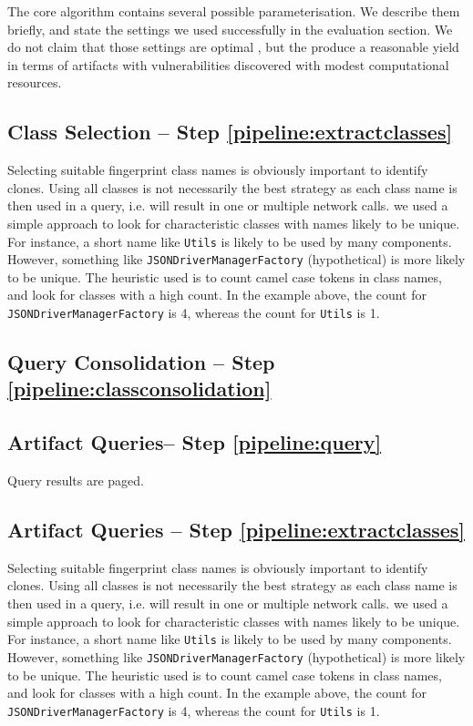 The core algorithm contains several possible parameterisation. We describe them briefly, and state the settings we used successfully in the evaluation section. We do not claim that those settings are optimal , but the produce a reasonable yield in terms of artifacts with vulnerabilities discovered with modest computational resources.




\subsection {Class Selection -- Step \ref{pipeline:extractclasses}}

Selecting suitable fingerprint class names is obviously important to identify clones. Using all classes is not necessarily the best strategy as each class name is then used in a query, i.e. will result in one or multiple network calls. we used a simple approach to look for characteristic classes with names likely to be unique. For instance, a short name like \texttt{Utils} is likely to be used by many components. However, something like \texttt{JSONDriverManagerFactory} (hypothetical) is more likely to be unique. The heuristic used is to count camel case tokens in class names, and look for classes with a high count. In the example above, the count for \texttt{JSONDriverManagerFactory} is 4, whereas the count for \texttt{Utils} is 1.



\subsection{Query Consolidation -- Step \ref{pipeline:classconsolidation}}

\subsection{Artifact Queries-- Step \ref{pipeline:query}}

Query results are paged. 


\subsection {Artifact Queries -- Step \ref{pipeline:extractclasses}}

Selecting suitable fingerprint class names is obviously important to identify clones. Using all classes is not necessarily the best strategy as each class name is then used in a query, i.e. will result in one or multiple network calls. we used a simple approach to look for characteristic classes with names likely to be unique. For instance, a short name like \texttt{Utils} is likely to be used by many components. However, something like \texttt{JSONDriverManagerFactory} (hypothetical) is more likely to be unique. The heuristic used is to count camel case tokens in class names, and look for classes with a high count. In the example above, the count for \texttt{JSONDriverManagerFactory} is 4, whereas the count for \texttt{Utils} is 1.





 